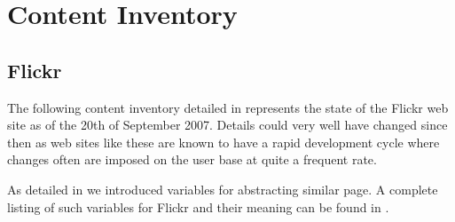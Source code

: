 \chapter{Content Inventory}
\label{appendix:content.inventory}

\section{Flickr}

The following content inventory detailed in
represents the state of the Flickr web site as of the 20th of September 2007.
Details could very well have changed since then as
web sites like these are known to have a rapid development cycle
where changes often are imposed on the user base at quite
a frequent rate.

As detailed in 
we introduced variables for abstracting
similar page. A complete listing of such variables for Flickr and their
meaning can be found in
.

